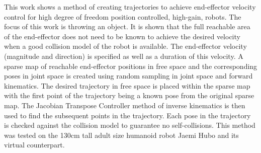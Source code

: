 This work shows a method of creating trajectories to achieve end-effector velocity control for high degree of freedom position controlled, high-gain, robots.  The focus of this work is throwing an object.  It is shown that the full reachable area of the end-effector does not need to be known to achieve the desired velocity when a good collision model of the robot is available.  The end-effector velocity (magnitude and direction) is specified as well as a duration of this velocity.  A sparse map of reachable end-effector positions in free space and the corresponding poses in joint space is created using random sampling in joint space and forward kinematics.  The desired trajectory in free space is placed within the sparse map with the first point of the trajectory being a known pose from the original sparse map.  The Jacobian Transpose Controller method of inverse kinematics is then used to find the subsequent points in the trajectory.  Each pose in the trajectory is checked against the collision model to guarantee no self-collisions.  This method was tested on the 130cm tall adult size humanoid robot Jaemi Hubo and its virtual counterpart.